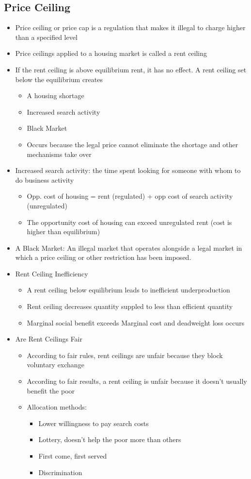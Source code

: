 \documentclass[11pt]{article}
\begin{document}
\subsection{Price Ceiling}
\label{sec:org1201df0}
\begin{itemize}
\item Price ceiling or price cap is a regulation that makes it illegal to charge higher than a 
specified level
\item Price ceilings applied to a housing market is called a rent ceiling
\item If the rent ceiling is above equilibrium rent, it has no effect. 
A rent ceiling set below the equilibrium creates
\begin{itemize}
\item A housing shortage
\item Increased search activity
\item Black Market
\item Occurs because the legal price cannot eliminate the shortage and other mechanisms take over
\end{itemize}
\item Increased search activity: the time spent looking for someone with whom to do business activity
\begin{itemize}
\item Opp. cost of housing = rent (regulated) + opp cost of search activity (unregulated)
\item The opportunity cost of housing can exceed unregulated rent (cost is higher than equilibrium)
\end{itemize}
\item A Black Market: An illegal market that operates alongside a legal market in which a price ceiling
or other restriction has been imposed.
\item Rent Ceiling Inefficiency
\begin{itemize}
\item A rent ceiling below equilibrium leads to inefficient underproduction
\item Rent ceiling decreases quantity suppled to less than efficient quantity
\item Marginal social benefit exceeds Marginal cost and deadweight loss occurs
\end{itemize}
\item Are Rent Ceilings Fair
\begin{itemize}
\item According to fair rules, rent ceilings are unfair because they block voluntary exchange
\item According to fair results, a rent ceiling is unfair because it doesn't usually benefit the poor
\item Allocation methods:
\begin{itemize}
\item Lower willingness to pay search costs
\item Lottery, doesn't help the poor more than others
\item First come, first served
\item Discrimination
\end{itemize}
\end{itemize}
\end{itemize}
\end{document}
